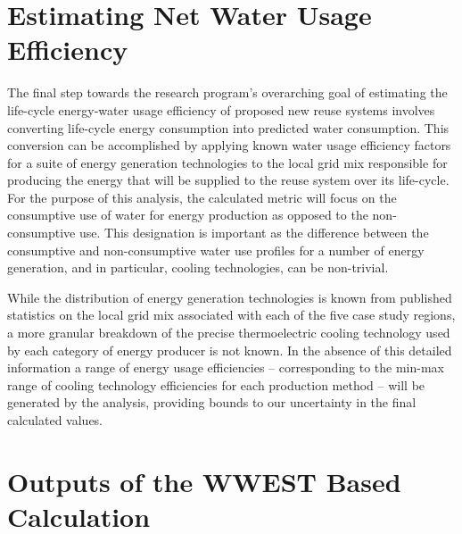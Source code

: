 \section{Estimating Net Water Usage Efficiency}

The final step towards the research program's overarching goal of estimating the life-cycle energy-water usage efficiency of proposed new reuse systems involves converting life-cycle energy consumption into predicted water consumption. This conversion can be accomplished by applying known water usage efficiency factors for a suite of energy generation technologies to the local grid mix responsible for producing the energy that will be supplied to the reuse system over its life-cycle. For the purpose of this analysis, the calculated metric will focus on the consumptive use of water for energy production as opposed to the non-consumptive use. This designation is important as the difference between the consumptive and non-consumptive water use profiles for a number of energy generation, and in particular, cooling technologies, can be non-trivial.

While the distribution of energy generation technologies is known from published statistics on the local grid mix associated with each of the five case study regions, a more granular breakdown of the precise thermoelectric cooling technology used by each category of energy producer is not known. In the absence of this detailed information a range of energy usage efficiencies -- corresponding to the min-max range of cooling technology efficiencies for each production method -- will be generated by the analysis, providing bounds to our uncertainty in the final calculated values. 

\section{Outputs of the WWEST Based Calculation}

